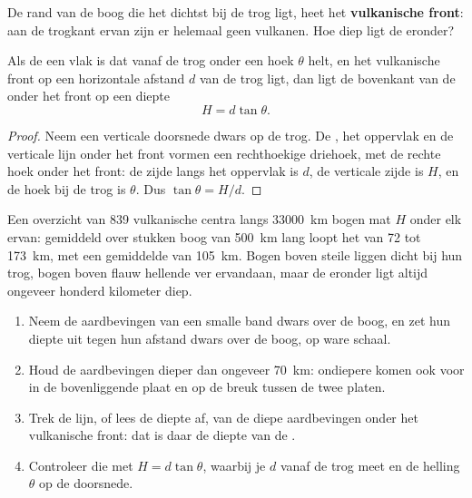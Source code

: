 De rand van de boog die het dichtst bij de trog ligt, heet het \textbf{vulkanische
front}: aan de trogkant ervan zijn er helemaal geen vulkanen. Hoe diep ligt
de  eronder?

\begin{proposition}\label{prop:g12:subduction-magmatism:depth}
Als de  een vlak is dat vanaf de trog onder een hoek $\theta$ helt, en
het vulkanische front op een horizontale afstand $d$ van de trog ligt, dan
ligt de bovenkant van de  onder het front op een diepte
\[
  H = d \tan\theta .
\]
\end{proposition}

\begin{proof}
Neem een verticale doorsnede dwars op de trog. De , het oppervlak en de
verticale lijn onder het front vormen een rechthoekige driehoek, met de rechte hoek
onder het front: de zijde langs het oppervlak is $d$, de verticale zijde is
$H$, en de hoek bij de trog is $\theta$. Dus $\tan\theta = H/d$.
\end{proof}

Een overzicht van 839 vulkanische centra langs \qty{33000}{km} bogen mat
$H$ onder elk ervan: gemiddeld over stukken boog van \qty{500}{km} lang
loopt het van 72 tot \qty{173}{km}, met een gemiddelde van \qty{105}{km}. Bogen boven
steile  liggen dicht bij hun trog, bogen boven flauw hellende  ver
ervandaan, maar de  eronder ligt altijd ongeveer honderd kilometer
diep.

\begin{method}\label{met:g12:subduction-magmatism:slab}
\begin{enumerate}
  \item Neem de aardbevingen van een smalle band dwars over de boog, en zet hun
        diepte uit tegen hun afstand dwars over de boog, op ware schaal.
  \item Houd de aardbevingen dieper dan ongeveer \qty{70}{km}: ondiepere
        komen ook voor in de bovenliggende plaat en op de breuk tussen de twee
        platen.
  \item Trek de lijn, of lees de diepte af, van de diepe aardbevingen onder
        het vulkanische front: dat is daar de diepte van de .
  \item Controleer die met $H = d\tan\theta$, waarbij je $d$ vanaf de trog meet en
        de helling $\theta$ op de doorsnede.
\end{enumerate}
\end{method}

